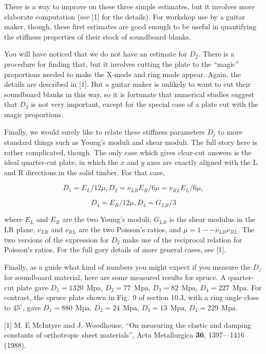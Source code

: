   There is a way to improve on these three simple estimates, but it involves 
  more elaborate computation (see [1] for the details). For workshop use by a 
  guitar maker, though, these first estimates are good enough to be useful in 
  quantifying the stiffness properties of their stock of soundboard blanks. 

  You will have noticed that we do not have an estimate for $D_2$. There is a 
  procedure for finding that, but it involves cutting the plate to the 
  ``magic'' proportions needed to make the X-mode and ring mode appear. Again, 
  the details are described in [1]. But a guitar maker is unlikely to want to 
  cut their soundboard blanks in this way, so it is fortunate that numerical 
  studies suggest that $D_2$ is not very important, except for the special case 
  of a plate cut with the magic proportions. 

  Finally, we would surely like to relate these stiffness parameters $D_j$ to 
  more standard things such as Young's moduli and shear moduli. The full story 
  here is rather complicated, though. The only case which gives clear-cut 
  answers is the ideal quarter-cut plate, in which the $x$ and $y$ axes are 
  exactly aligned with the L and R directions in the solid timber. For that 
  case, 

  $$D_1 = E_L/12 \mu, D_2 = \nu_{LR}E_R/6 \mu = \nu_{RL}E_L/6 \mu, $$ 

  $$D_3 = E_R/12 \mu, D_4 = G_{LR}/3 \tag{6}$$ 

  where $E_L$ and $E_R$ are the two Young's moduli, $G_{LR}$ is the shear 
  modulus in the LR plane, $\nu_{LR}$ and $\nu_{RL}$ are the two Poisson's 
  ratios, and $\mu=1 -- \nu_{LR} \nu_{RL} .$ The two versions of the expression 
  for $D_2$ make use of the reciprocal relation for Poisson's ratios. For the 
  full gory details of more general cases, see [1]. 

  Finally, as a guide what kind of numbers you might expect if you measure the 
  $D_j$ for soundboard material, here are some measured results for spruce. A 
  quarter-cut plate gave $D_1=1320~\mathrm{~Mpa}$, $D_2=77~\mathrm{~Mpa}$, 
  $D_3=82~\mathrm{~Mpa}$, $D_4=227~\mathrm{~Mpa}$. For contrast, the spruce 
  plate shown in Fig.\ 9 of section 10.3, with a ring angle close to 
  $45^\circ$, gave $D_1=880~\mathrm{~Mpa}$, $D_2=24~\mathrm{~Mpa}$, 
  $D_3=13~\mathrm{~Mpa}$, $D_4=229~\mathrm{~Mpa}$. 

  \sectionreferences{}[1] M. E McIntyre and J. Woodhouse, “On measuring the 
  elastic and damping constants of orthotropic sheet materials”, Acta 
  Metallurgica \textbf{36}, 1397—1416 (1988). 